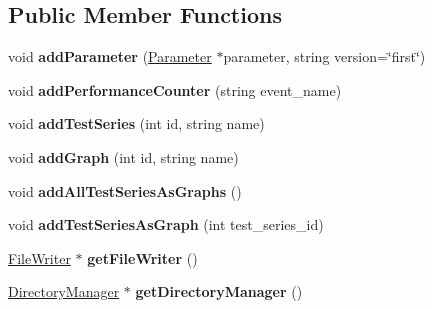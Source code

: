 \subsection*{Public Member Functions}
\begin{DoxyCompactItemize}
\item 
\hypertarget{classAbstractBenchmark_acd9e35e5271acdb1c13ea7cfa0efce38}{void {\bfseries add\-Parameter} (\hyperlink{classParameter}{Parameter} $\ast$parameter, string version=\char`\"{}first\char`\"{})}\label{classAbstractBenchmark_acd9e35e5271acdb1c13ea7cfa0efce38}

\item 
\hypertarget{classAbstractBenchmark_a980f7c154941f5e73eb3b366344f5d11}{void {\bfseries add\-Performance\-Counter} (string event\-\_\-name)}\label{classAbstractBenchmark_a980f7c154941f5e73eb3b366344f5d11}

\item 
\hypertarget{classAbstractBenchmark_a1bade816065ee883f66e93b58a77c9a6}{void {\bfseries add\-Test\-Series} (int id, string name)}\label{classAbstractBenchmark_a1bade816065ee883f66e93b58a77c9a6}

\item 
\hypertarget{classAbstractBenchmark_ab5c3e88bbe0ff444749fa166894f4ae3}{void {\bfseries add\-Graph} (int id, string name)}\label{classAbstractBenchmark_ab5c3e88bbe0ff444749fa166894f4ae3}

\item 
\hypertarget{classAbstractBenchmark_a48f7a00b650805d6a587118b8ed4f2b7}{void {\bfseries add\-All\-Test\-Series\-As\-Graphs} ()}\label{classAbstractBenchmark_a48f7a00b650805d6a587118b8ed4f2b7}

\item 
\hypertarget{classAbstractBenchmark_a9edf78c41e7049260b78f8f1fc204a65}{void {\bfseries add\-Test\-Series\-As\-Graph} (int test\-\_\-series\-\_\-id)}\label{classAbstractBenchmark_a9edf78c41e7049260b78f8f1fc204a65}

\item 
\hypertarget{classAbstractBenchmark_acdcd509afeae759cd8d379008b764304}{\hyperlink{classFileWriter}{File\-Writer} $\ast$ {\bfseries get\-File\-Writer} ()}\label{classAbstractBenchmark_acdcd509afeae759cd8d379008b764304}

\item 
\hypertarget{classAbstractBenchmark_af11d0e713c390548cabe124e516cd1a6}{\hyperlink{classDirectoryManager}{Directory\-Manager} $\ast$ {\bfseries get\-Directory\-Manager} ()}\label{classAbstractBenchmark_af11d0e713c390548cabe124e516cd1a6}


\end{DoxyCompactItemize}
